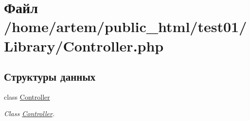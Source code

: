 \hypertarget{_controller_8php}{\section{Файл /home/artem/public\-\_\-html/test01/\-Library/\-Controller.php}
\label{_controller_8php}
}
\subsection*{Структуры данных}
\begin{DoxyCompactItemize}
\item 
class \hyperlink{class_controller}{Controller}
\begin{DoxyCompactList}\small\item\em Class \hyperlink{class_controller}{Controller}. \end{DoxyCompactList}\end{DoxyCompactItemize}
